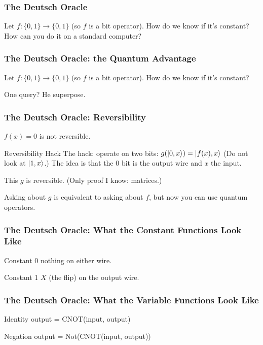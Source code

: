 \documentclass{beamer}
\begin{document}
\begin{frame}
\frametitle{The Deutsch Oracle}

Let $f: \{0, 1\} \to \{0, 1\}$ (so $f$ is a bit operator).
How do we know if it's constant? How can you do it on a standard computer?

\end{frame}

\begin{frame}
\frametitle{The Deutsch Oracle: the Quantum Advantage}

Let $f: \{0, 1\} \to \{0, 1\}$ (so $f$ is a bit operator).
How do we know if it's constant?

One query? He superpose.

\end{frame}

\begin{frame}
\frametitle{The Deutsch Oracle: Reversibility}

$f(x) = 0$ is not reversible.

\begin{block}{Reversibility Hack}
    The hack: operate on two bits: $g(\ket{0, x}) = \ket{f(x), x}$
    (Do not look at $\ket{1, x}$.)
    The idea is that the 0 bit is the output wire and $x$ the input.
\end{block}

This $g$ is reversible. (Only proof I know: matrices.)

Asking about $g$ is equivalent to asking about $f$, but now you can use quantum operators.

\end{frame}

\begin{frame}
\frametitle{The Deutsch Oracle: What the Constant Functions Look Like}

\begin{block}{Constant 0}
nothing on either wire.
\end{block}

\begin{block}{Constant 1}
$X$ (the flip) on the output wire.
\end{block}

\end{frame}

\begin{frame}
\frametitle{The Deutsch Oracle: What the Variable Functions Look Like}

\begin{block}{Identity}
output = CNOT(input, output)
\end{block}

\begin{block}{Negation}
output = Not(CNOT(input, output))
\end{block}

\end{frame}
\end{document}
